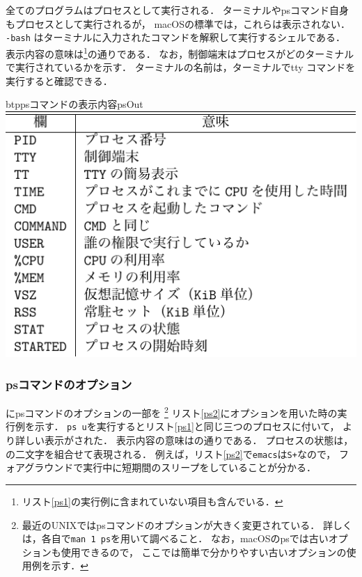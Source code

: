 

全てのプログラムはプロセスとして実行される．
ターミナルやpsコマンド自身もプロセスとして実行されるが，
macOSの標準では，これらは表示されない．
\texttt{-bash} はターミナルに入力されたコマンドを解釈して実行するシェルである．
表示内容の意味は\footnote{
リスト\ref{ps1}の実行例に含まれていない項目も含んでいる．}の通りである．
なお，制御端末はプロセスがどのターミナルで実行されているかを示す．
ターミナルの名前は，ターミナルでtty コマンドを実行すると確認できる．



\begin{mytable}{btp}{psコマンドの表示内容}{psOut}
  \includegraphics[scale=1.0]{Tbl/psOut.pdf}
\end{mytable}

\subsubsection{psコマンドのオプション}
にpsコマンドのオプションの一部を
\footnote{
最近のUNIXではpsコマンドのオプションが大きく変更されている．
詳しくは，各自で\texttt{man 1 ps}を用いて調べること．
なお，macOSのpsでは古いオプションも使用できるので，
ここでは簡単で分かりやすい古いオプションの使用例を示す．
}
リスト\ref{ps2}にオプションを用いた時の実行例を示す．
\texttt{ps u}を実行するとリスト\ref{ps1}と同じ三つのプロセスに付いて，
より詳しい表示がされた．
表示内容の意味はの通りである．
プロセスの状態は，の二文字を組合せて表現される．
例えば，リスト\ref{ps2}で\texttt{emacs}は\texttt{S+}なので，
フォアグラウンドで実行中に短期間のスリープをしていることが分かる．

